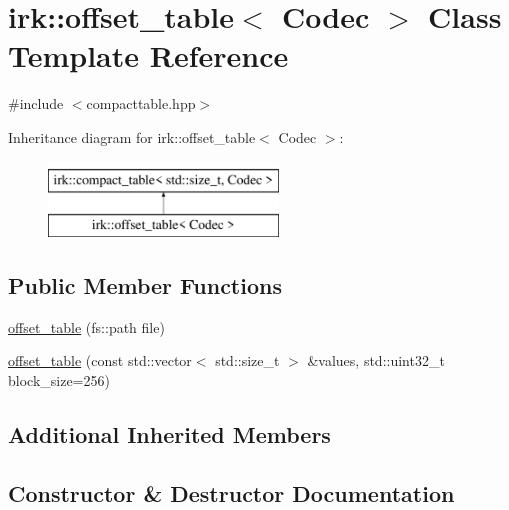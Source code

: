 \hypertarget{classirk_1_1offset__table}{}\section{irk\+:\+:offset\+\_\+table$<$ Codec $>$ Class Template Reference}
\label{classirk_1_1offset__table}


{\ttfamily \#include $<$compacttable.\+hpp$>$}

Inheritance diagram for irk\+:\+:offset\+\_\+table$<$ Codec $>$\+:\begin{figure}[H]
\begin{center}
\leavevmode
\includegraphics[height=2.000000cm]{classirk_1_1offset__table}
\end{center}
\end{figure}
\subsection*{Public Member Functions}
\begin{DoxyCompactItemize}
\item 
\mbox{\hyperlink{classirk_1_1offset__table_af565159df83dc228d3c4e72e919b3941}{offset\+\_\+table}} (fs\+::path file)
\item 
\mbox{\hyperlink{classirk_1_1offset__table_ab4e9bad8dff1f4a9c5d37d6735b62598}{offset\+\_\+table}} (const std\+::vector$<$ std\+::size\+\_\+t $>$ \&values, std\+::uint32\+\_\+t block\+\_\+size=256)
\end{DoxyCompactItemize}
\subsection*{Additional Inherited Members}


\subsection{Constructor \& Destructor Documentation}
\mbox{\label{classirk_1_1offset__table_af565159df83dc228d3c4e72e919b3941}} 
